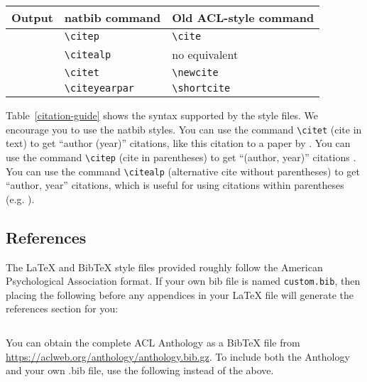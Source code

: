 \documentclass[11pt]{article}
\begin{document}
\begin{table*}
\centering
\begin{tabular}{lll}
\hline
\textbf{Output} & \textbf{natbib command} & \textbf{Old ACL-style command}\\
\hline
\citep{andrew2007scalable} & \verb|\citep| & \verb|\cite| \\
\citealp{Gusfield:97} & \verb|\citealp| & no equivalent \\
\citet{Gusfield:97} & \verb|\citet| & \verb|\newcite| \\
\citeyearpar{Gusfield:97} & \verb|\citeyearpar| & \verb|\shortcite| \\
\hline
\end{tabular}
\caption{\label{citation-guide}
Citation commands supported by the style file.
The style is based on the natbib package and supports all natbib citation commands.
It also supports commands defined in previous ACL style files for compatibility.
}
\end{table*}

Table~\ref{citation-guide} shows the syntax supported by the style files.
We encourage you to use the natbib styles.
You can use the command \verb|\citet| (cite in text) to get ``author (year)'' citations, like this citation to a paper by \citet{Gusfield:97}.
You can use the command \verb|\citep| (cite in parentheses) to get ``(author, year)'' citations \citep{Gusfield:97}.
You can use the command \verb|\citealp| (alternative cite without parentheses) to get ``author, year'' citations, which is useful for using citations within parentheses (e.g. \citealp{Gusfield:97}).

\subsection{References}

\nocite{Ando2005,andrew2007scalable,rasooli-tetrault-2015}

The \LaTeX{} and Bib\TeX{} style files provided roughly follow the American Psychological Association format.
If your own bib file is named \texttt{custom.bib}, then placing the following before any appendices in your \LaTeX{} file will generate the references section for you:
\begin{quote}
\begin{verbatim}

\end{verbatim}
\end{quote}

You can obtain the complete ACL Anthology as a Bib\TeX{} file from \url{https://aclweb.org/anthology/anthology.bib.gz}.
To include both the Anthology and your own .bib file, use the following instead of the above.
\begin{quote}
\begin{verbatim}

\end{verbatim}
\end{quote}
\end{document}
